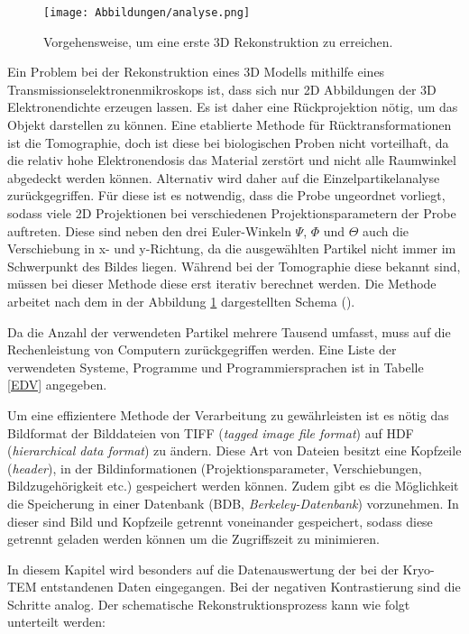 \begin{figure}
	\texttt{[image: Abbildungen/analyse.png]}
	\caption[Vorgehensweise zur ersten 3D Rekonstruktion]{Vorgehensweise, um eine erste 3D Rekonstruktion zu erreichen.}
	\label{vorgehensweise}
\end{figure}


Ein Problem bei der Rekonstruktion eines 3D Modells mithilfe eines Transmissionselektronenmikroskops ist, dass sich nur 2D Abbildungen der 3D Elektronendichte erzeugen lassen.
Es ist daher eine Rückprojektion nötig, um das Objekt darstellen zu können.
Eine etablierte Methode für Rücktransformationen ist die Tomographie, doch ist diese bei biologischen Proben nicht vorteilhaft, da die relativ hohe Elektronendosis das Material zerstört und nicht alle Raumwinkel abgedeckt werden können.
Alternativ wird daher auf die Einzelpartikelanalyse zurückgegriffen.
Für diese ist es notwendig, dass die Probe ungeordnet vorliegt, sodass viele 2D Projektionen bei verschiedenen Projektionsparametern der Probe auftreten.
Diese sind neben den drei Euler-Winkeln $\Psi$, $\Phi$ und $\Theta$ auch die Verschiebung in x- und y-Richtung, da die ausgewählten Partikel nicht immer im Schwerpunkt des Bildes liegen.
Während bei der Tomographie diese bekannt sind, müssen bei dieser Methode diese erst iterativ berechnet werden.
Die Methode arbeitet nach dem in der Abbildung \ref{vorgehensweise} dargestellten Schema (\cite{einzelpartikel}).

Da die Anzahl der verwendeten Partikel mehrere Tausend umfasst, muss auf die Rechenleistung von Computern zurückgegriffen werden.
Eine Liste der verwendeten Systeme, Programme und Programmiersprachen ist in Tabelle \ref{EDV} angegeben.

Um eine effizientere Methode der Verarbeitung zu gewährleisten ist es nötig das Bildformat der Bilddateien von TIFF (\textit{tagged image file format}) auf HDF (\textit{hierarchical data format}) zu ändern.
Diese Art von Dateien besitzt eine Kopfzeile (\textit{header}), in der Bildinformationen (Projektionsparameter, Verschiebungen, Bildzugehörigkeit etc.) gespeichert werden können.
Zudem gibt es die Möglichkeit die Speicherung in einer Datenbank (BDB, \textit{Berkeley-Datenbank}) vorzunehmen.
In dieser sind Bild und Kopfzeile getrennt voneinander gespeichert, sodass diese getrennt geladen werden können um die Zugriffszeit zu minimieren.

In diesem Kapitel wird besonders auf die Datenauswertung der bei der Kryo-TEM entstandenen Daten eingegangen.
Bei der negativen Kontrastierung sind die Schritte analog. 
Der schematische Rekonstruktionsprozess kann wie folgt unterteilt werden:

